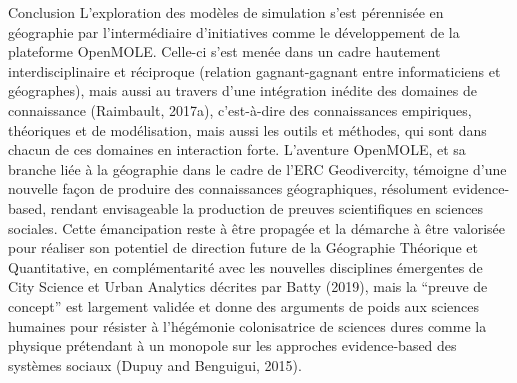 \documentclass[10pt]{article}
\begin{document}
Conclusion
L’exploration des modèles de simulation s’est pérennisée en géographie par l'intermédiaire d’initiatives comme le développement de la plateforme OpenMOLE. Celle-ci s’est menée dans un cadre hautement interdisciplinaire et réciproque (relation gagnant-gagnant entre informaticiens et géographes), mais aussi au travers d’une intégration inédite des domaines de connaissance (Raimbault, 2017a), c’est-à-dire des connaissances empiriques, théoriques et de modélisation, mais aussi les outils et méthodes, qui sont dans chacun de ces domaines en interaction forte. L’aventure OpenMOLE, et sa branche liée à la géographie dans le cadre de l’ERC Geodivercity, témoigne d’une nouvelle façon de produire des connaissances géographiques, résolument evidence-based, rendant envisageable la production de preuves scientifiques en sciences sociales. Cette émancipation reste à être propagée et la démarche à être valorisée pour réaliser son potentiel de direction future de la Géographie Théorique et Quantitative, en complémentarité avec les nouvelles disciplines émergentes de City Science et Urban Analytics décrites par Batty (2019), mais la “preuve de concept” est largement validée et donne des arguments de poids aux sciences humaines pour résister à l'hégémonie colonisatrice de sciences dures comme la physique prétendant à un monopole sur les approches evidence-based des systèmes sociaux (Dupuy and Benguigui, 2015).









\end{document}
